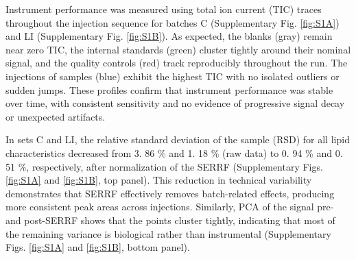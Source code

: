 \documentclass[10pt,letterpaper]{article}
\begin{document}
Instrument performance was measured using total ion current (TIC) traces throughout the injection sequence for batches C (Supplementary Fig. \ref{fig:S1A}) and LI (Supplementary Fig. \ref{fig:S1B}). As expected, the blanks (gray) remain near zero TIC, the internal standards (green) cluster tightly around their nominal signal, and the quality controls (red) track reproducibly throughout the run. The injections of samples (blue) exhibit the highest TIC with no isolated outliers or sudden jumps. These profiles confirm that instrument performance was stable over time, with consistent sensitivity and no evidence of progressive signal decay or unexpected artifacts.

In sets C and LI, the relative standard deviation of the sample (RSD) for all lipid characteristics decreased from 3. 86 \% and 1. 18 \% (raw data)  to 0. 94 \% and 0. 51 \%, respectively, after normalization of the SERRF (Supplementary Figs. \ref{fig:S1A} and \ref{fig:S1B}, top panel). This reduction in technical variability demonstrates that SERRF effectively removes batch-related effects, producing more consistent peak areas across injections. Similarly, PCA of the signal pre- and post-SERRF shows that the points cluster tightly, indicating that most of the remaining variance is biological rather than instrumental (Supplementary Figs. \ref{fig:S1A} and \ref{fig:S1B}, bottom panel).
\end{document}
